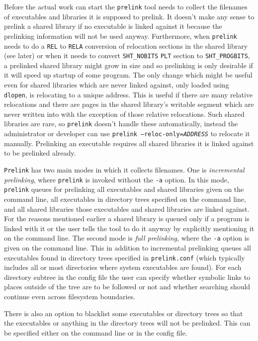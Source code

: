 \documentclass[twoside]{article}
\def\tts#1{\texttt{\small #1}}
\begin{document}
Before the actual work can start the \tts{prelink} tool needs to collect the
filenames of executables and libraries it is supposed to prelink.
It doesn't make any sense to prelink a shared library if no executable is
linked against it because the prelinking information will not be used anyway.
Furthermore, when \tts{prelink} needs to do a \tts{REL} to \tts{RELA}
conversion of relocation sections in the shared library (see later)
or when it needs to convert \tts{SHT\_NOBITS} \tts{PLT} section to
\tts{SHT\_PROGBITS}, a prelinked shared library might grow in size and so
prelinking is only desirable if it will speed up startup of some
program.  The only change which might be useful even for shared libraries
which are never linked against, only loaded using \tts{dlopen}, is
relocating to a unique address.  This is useful if there are many relative
relocations and there are pages in the shared library's writable segment
which are never written into with the exception of those relative
relocations.  Such shared libraries are rare, so \tts{prelink} doesn't
handle these automatically, instead the administrator or developer can
use \tts{prelink --reloc-only={\sl ADDRESS}} to relocate it manually.
Prelinking an executable requires all shared libraries it is linked against
to be prelinked already.

\tts{Prelink} has two main modes in which it collects filenames.
One is {\sl incremental prelinking}, where \tts{prelink} is invoked without
the \tts{-a} option.  In this mode, \tts{prelink} queues for prelinking
all executables and shared libraries given on the command line, all executables
in directory trees specified on the command line, and all shared libraries
those executables and shared libraries are linked against.
For the reasons mentioned earlier a shared library is queued only if a
program is linked with it or the user tells the tool to do it anyway
by explicitly mentioning it on the command line.
The second mode is {\sl full prelinking}, where the \tts{-a} option is
given on the command line.  This in addition to incremental prelinking
queues all executables found in directory trees specified in \tts{prelink.conf}
(which typically includes all or most directories where system executables
are found).  For each directory subtree in the config file the user
can specify whether symbolic links to places outside of the tree are to be followed
or not and whether searching should continue even across filesystem
boundaries.

There is also an option to blacklist some executables or directory trees
so that the executables or anything in the directory trees will not
be prelinked.  This can be specified either on the command line or in
the config file.
\end{document}
